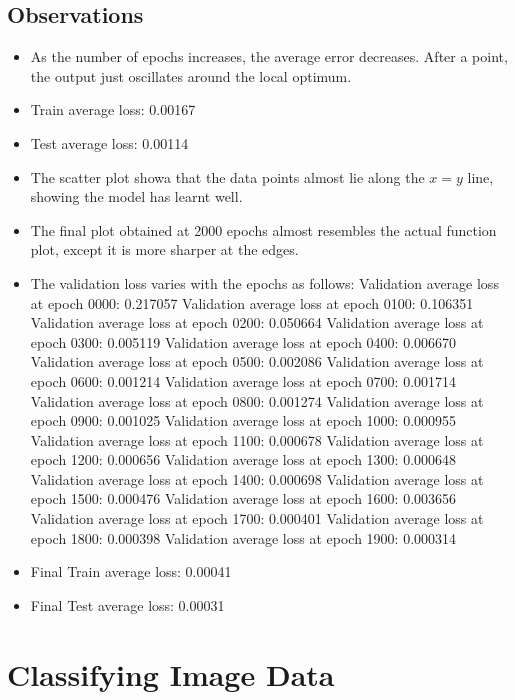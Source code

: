 \documentclass[10pt,a4paper]{article}
\begin{document}
\subsection{Observations}
\begin{itemize}
    \item As the number of epochs increases, the average error decreases. After a point, the output just oscillates around the local optimum.
    \item Train average loss: 0.00167
    \item Test average loss: 0.00114
    \item The scatter plot showa that the data points almost lie along the $x=y$ line, showing the model has learnt well.
    \item The final plot obtained at 2000 epochs almost resembles the actual function plot, except it is more sharper at the edges.
    \item The validation loss varies with the epochs as follows:
    \subitem Validation average loss at epoch 0000: 0.217057
    \subitem Validation average loss at epoch 0100: 0.106351
	\subitem Validation average loss at epoch 0200: 0.050664
	\subitem Validation average loss at epoch 0300: 0.005119
	\subitem Validation average loss at epoch 0400: 0.006670
	\subitem Validation average loss at epoch 0500: 0.002086
	\subitem Validation average loss at epoch 0600: 0.001214
	\subitem Validation average loss at epoch 0700: 0.001714
	\subitem Validation average loss at epoch 0800: 0.001274
	\subitem Validation average loss at epoch 0900: 0.001025
	\subitem Validation average loss at epoch 1000: 0.000955
	\subitem Validation average loss at epoch 1100: 0.000678
	\subitem Validation average loss at epoch 1200: 0.000656
	\subitem Validation average loss at epoch 1300: 0.000648
	\subitem Validation average loss at epoch 1400: 0.000698
	\subitem Validation average loss at epoch 1500: 0.000476
	\subitem Validation average loss at epoch 1600: 0.003656
	\subitem Validation average loss at epoch 1700: 0.000401
	\subitem Validation average loss at epoch 1800: 0.000398
	\subitem Validation average loss at epoch 1900: 0.000314
	\item Final Train average loss: 0.00041
	\item Final Test average loss: 0.00031
\end{itemize}


\section{Classifying Image Data}
\end{document}
